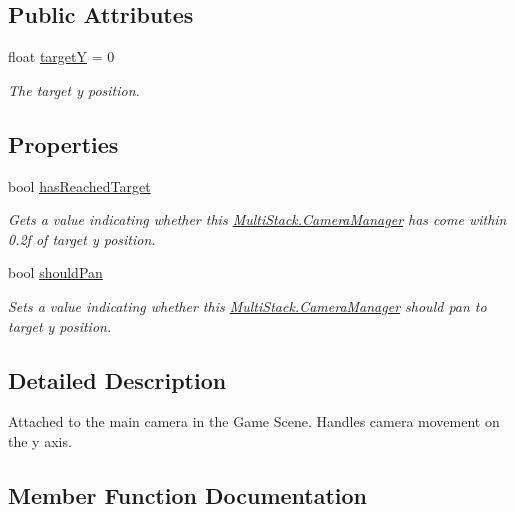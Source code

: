\subsection*{Public Attributes}
\begin{DoxyCompactItemize}
\item 
float \hyperlink{class_multi_stack_1_1_camera_manager_a8dc8d08acda20d2098ca43430582199b}{target\+Y} = 0
\begin{DoxyCompactList}\small\item\em The target y position. \end{DoxyCompactList}\end{DoxyCompactItemize}
\subsection*{Properties}
\begin{DoxyCompactItemize}
\item 
bool \hyperlink{class_multi_stack_1_1_camera_manager_a47e71a3bf314c2f2dba156fc47e26127}{has\+Reached\+Target}
\begin{DoxyCompactList}\small\item\em Gets a value indicating whether this \hyperlink{class_multi_stack_1_1_camera_manager}{Multi\+Stack.\+Camera\+Manager} has come within 0.\+2f of target y position. \end{DoxyCompactList}\item 
bool \hyperlink{class_multi_stack_1_1_camera_manager_aa36c3004b512594116595bc980734321}{should\+Pan}
\begin{DoxyCompactList}\small\item\em Sets a value indicating whether this \hyperlink{class_multi_stack_1_1_camera_manager}{Multi\+Stack.\+Camera\+Manager} should pan to target y position. \end{DoxyCompactList}\end{DoxyCompactItemize}


\subsection{Detailed Description}
Attached to the main camera in the Game Scene. Handles camera movement on the y axis. 



\subsection{Member Function Documentation}
\hypertarget{class_multi_stack_1_1_camera_manager_a3085f8ea5bbe1beb88a3219eba1e51bf}{}
